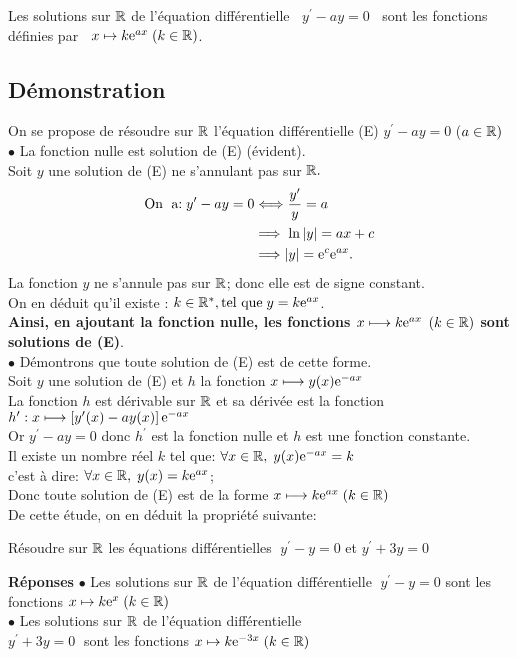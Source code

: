 \begin{theorem}
Les solutions sur $ \mathbb{R} $ de l'équation différentielle $\;\; y^{\prime}-ay=0 \;\;$ sont les fonctions définies par  $\;\; x\mapsto k\mathrm{e}^{ax}\; (k\in\mathbb{R}) $.
\end{theorem}

\subsection*{Démonstration}
On se propose de résoudre sur $ \mathbb{R} $ l'équation différentielle (E) $ y^{\prime} -ay=0$\; ($ a\in \mathbb{R}) $\\
$ \bullet $ La fonction nulle est solution de (E) \;(évident).\\
Soit $ y $  une solution de (E) ne s'annulant pas sur $ \mathbb{R}.$
\begin{align*}
\text{On \;a:\;}   y^{\prime} -ay=0& \Longleftrightarrow  \frac{y^{\prime}}{y}=a\\
&\Longrightarrow  \; \ln\left\lvert y \right\rvert=ax+c \\
&\Longrightarrow  \left\lvert y \right\rvert=\mathrm{e}^{c}\mathrm{e}^{ax}.
\end{align*}
La fonction $ y $ ne s'annule pas sur $ \mathbb{R} $; donc elle est de signe constant.\\ On en déduit qu'il existe :  $ k\in \mathbb{R}^*,\text{tel que}\; y=k\mathrm{e}^{ax} $.\\  \textbf{ Ainsi, en ajoutant la fonction nulle, les fonctions \; $ x\longmapsto k\mathrm{e}^{ax} $\;  $ (k\in \mathbb{R}) $\; sont solutions de (E)}.\\
$ \bullet $ Démontrons que toute solution de (E) est de  cette forme.\\Soit
$ y $  une solution de (E) et $ h $ la fonction \;$ x  \longmapsto y(x)\mathrm{e}^{-ax} $\\La fonction $ h $ est dérivable sur $ \mathbb{R} $   et sa dérivée est la fonction $ h^{\prime}: x\longmapsto \left[ y^{\prime}(x)-ay(x) \right]\mathrm{e}^{-ax} $\\ Or \; $ y^{\prime}-ay=0 $\; donc $ h^{\prime} $ est la fonction nulle et $ h $ est une fonction constante.\\ Il existe un nombre réel  $ k $ tel que: $ \forall x\in\mathbb{R},\; y(x)\mathrm{e}^{-ax}=k $\\ c'est à dire: $ \forall x\in\mathbb{R}, \; y(x)=k\mathrm{e}^{ax} $;\\ Donc toute solution de (E) est de la forme\; $ x\longmapsto k\mathrm{e}^{ax}\; (k\in\mathbb{R}) $\\
De cette étude, on en déduit la propriété suivante:


\begin{example}
Résoudre sur $ \mathbb{R} $ les équations différentielles $\; y^{\prime}-y=0 $\;  et\; $ y^{\prime}+3y=0 $

\textbf{Réponses}
$ \bullet $ Les solutions sur $ \mathbb{R} $ de l'équation différentielle $ \;y^{\prime}-y=0 $  sont les fonctions  $ x\mapsto k\mathrm{e}^{x}\; (k\in\mathbb{R}) $\\
$ \bullet $ Les solutions sur $ \mathbb{R} $ de l'équation différentielle\\                                         $ y^{\prime}+3y=0 \;$ sont les fonctions  $ x\mapsto k\mathrm{e}^{-3x}\; (k\in\mathbb{R}) $
\end{example}

